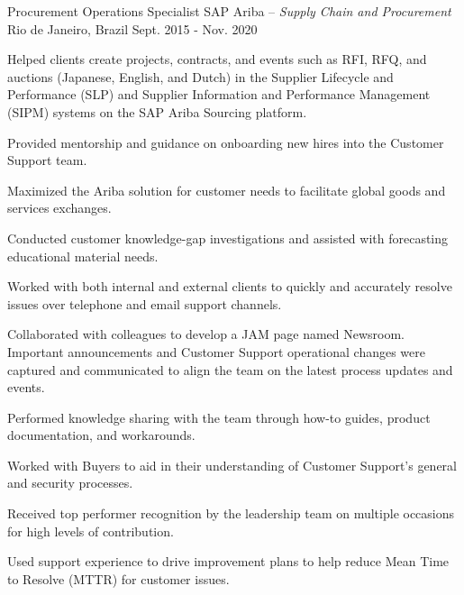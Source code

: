 \begin{cventries}
\cventry
{Procurement Operations Specialist} %
{SAP Ariba \textmd{-- \em{Supply Chain and Procurement}}} %
{Rio de Janeiro, Brazil} %
{Sept. 2015 - Nov. 2020} %
{ %
\begin{cvitems}
\item {Helped clients create projects, contracts, and events such as RFI, RFQ, and auctions (Japanese, English, and Dutch) in the Supplier Lifecycle and Performance (SLP) and Supplier Information and Performance Management (SIPM) systems on the SAP Ariba Sourcing platform.}
\item {Provided mentorship and guidance on onboarding new hires into the Customer Support team.}
\item {Maximized the Ariba solution for customer needs to facilitate global goods and services exchanges.}
\item {Conducted customer knowledge-gap investigations and assisted with forecasting educational material needs.}
\item {Worked with both internal and external clients to quickly and accurately resolve issues over telephone and email support channels.}
\item {Collaborated with colleagues to develop a JAM page named Newsroom. Important announcements and Customer Support operational changes were captured and communicated to align the team on the latest process updates and events.}
\item {Performed knowledge sharing with the team through how-to guides, product documentation, and workarounds.}
\item {Worked with Buyers to aid in their understanding of Customer Support's general and security processes.}
\item {Received top performer recognition by the leadership team on multiple occasions for high levels of contribution.}
\item {Used support experience to drive improvement plans to help reduce Mean Time to Resolve (MTTR) for customer issues.}
\end{cvitems}
}



\end{cventries}
